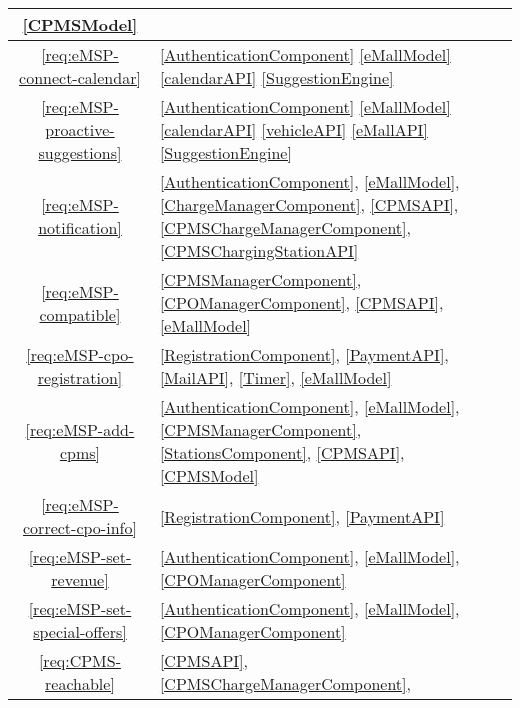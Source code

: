 \begin{table}[h]
\begin{center}
\begin{tabular}{|c||p{15.5cm}|}
            \ref{CPMSModel}
            \\
            \hline
            \ref{req:eMSP-connect-calendar} &
            \ref{AuthenticationComponent}
            \ref{eMallModel}
            \ref{calendarAPI}
            \ref{SuggestionEngine}
            \\
            \hline
            \ref{req:eMSP-proactive-suggestions} &
            \ref{AuthenticationComponent}
            \ref{eMallModel}
            \ref{calendarAPI}
            \ref{vehicleAPI}
            \ref{eMallAPI}
            \ref{SuggestionEngine}
            \\
            \hline
            \ref{req:eMSP-notification} &
            \ref{AuthenticationComponent},
            \ref{eMallModel},
            \ref{ChargeManagerComponent},
            \ref{CPMSAPI},
            \ref{CPMSChargeManagerComponent},
            \ref{CPMSChargingStationAPI}
            \\
            \hline
            \ref{req:eMSP-compatible} &
            \ref{CPMSManagerComponent},
            \ref{CPOManagerComponent},
            \ref{CPMSAPI},
            \ref{eMallModel}
            \\
            \hline
            \ref{req:eMSP-cpo-registration} &
            \ref{RegistrationComponent},
            \ref{PaymentAPI},
            \ref{MailAPI},
            \ref{Timer},
            \ref{eMallModel}
            \\
            \hline
            \ref{req:eMSP-add-cpms} &
            \ref{AuthenticationComponent},
            \ref{eMallModel},
            \ref{CPMSManagerComponent},
            \ref{StationsComponent},
            \ref{CPMSAPI},
            \ref{CPMSModel}
            \\
            \hline
            \ref{req:eMSP-correct-cpo-info} &
            \ref{RegistrationComponent},
            \ref{PaymentAPI}
            \\
            \hline
            \ref{req:eMSP-set-revenue} &
            \ref{AuthenticationComponent},
            \ref{eMallModel},
            \ref{CPOManagerComponent}
            \\
            \hline
            \ref{req:eMSP-set-special-offers} &
            \ref{AuthenticationComponent},
            \ref{eMallModel},
            \ref{CPOManagerComponent}
            \\
            \hline
            \ref{req:CPMS-reachable} &
            \ref{CPMSAPI},
            \ref{CPMSChargeManagerComponent},

\end{tabular}
\end{center}
\end{table}
